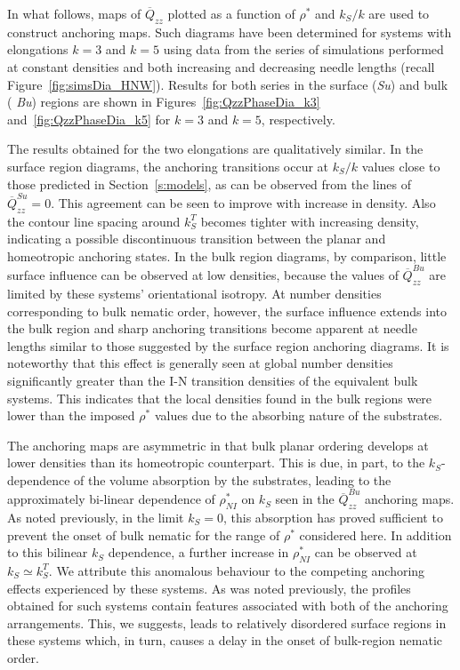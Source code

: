 \documentclass[aps,10pt,twocolumn]{revtex4}
\begin{document}

In what follows, maps of $\overline{Q}_{zz}$ plotted as a function of $\rho^{*}$ and $k_S/k$ are used to construct
anchoring maps. Such diagrams have been determined for systems with elongations $k=3$ and $k=5$ using
data from the series of simulations performed at constant densities and both increasing and decreasing needle
lengths (recall Figure~\ref{fig:simsDia_HNW}). Results for both series in the surface ({\em Su}) and bulk ({\em
Bu}) regions are shown in Figures~\ref{fig:QzzPhaseDia_k3} and~\ref{fig:QzzPhaseDia_k5} for $k=3$ and $k=5$,
respectively.

The results obtained for the two elongations are qualitatively similar. In the surface region diagrams, the
anchoring transitions occur at $k_S/k$ values close to those predicted in Section~\ref{s:models}, as can be
observed from the lines of $\overline{Q}^{Su}_{zz} = 0$. This agreement can be seen to improve with increase in
density. Also the contour line spacing around $k_S^T$ becomes tighter with increasing density, indicating a
possible discontinuous transition between the planar and homeotropic anchoring states. In the bulk region
diagrams, by comparison, little surface influence can be observed at low densities, because the values of
$\overline{Q}^{Bu}_{zz}$ are limited by these systems' orientational isotropy. At number densities corresponding
to bulk nematic order, however, the surface influence extends into the bulk region and sharp anchoring transitions
become apparent at needle lengths similar to those suggested by the surface region anchoring diagrams. It is
noteworthy that this effect is generally seen at global number densities significantly greater than the I-N
transition densities of the equivalent bulk systems. This indicates that the local densities found in the bulk
regions were lower than the imposed $\rho^{*}$ values due to the absorbing nature of the substrates.

The anchoring maps are asymmetric in that bulk planar ordering develops at lower densities than its
homeotropic counterpart. This is due, in part, to the $k_S$-dependence of the volume absorption by the substrates,
leading to the approximately bi-linear dependence of $\rho^{*}_{NI}$ on $k_S$ seen in the $\overline{Q}^{Bu}_{zz}$
anchoring maps. As noted previously, in the limit $k_S=0$, this absorption has proved sufficient to prevent the
onset of bulk nematic for the range of $\rho^{*}$ considered here. In addition to this bilinear $k_S$ dependence,
a further increase in $\rho^{*}_{NI}$ can be observed at $k_S\simeq k_S^T$. We attribute this anomalous behaviour
to the competing anchoring effects experienced by these systems. As was noted previously, the profiles obtained
for such systems contain features associated with both of the anchoring arrangements. This, we suggests, leads to
relatively disordered surface regions in these systems which, in turn, causes a delay in the onset of bulk-region
nematic order.
\end{document}
